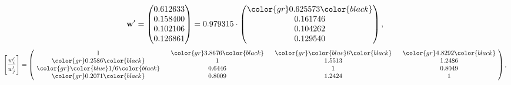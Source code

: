\begin{example}
\begin{equation*}
\mathbf{w}^{\prime} =
\begin{pmatrix}
0.612633\\
0.158400\\
0.102106\\
0.126861
\end{pmatrix} =
0.979315\cdot
\begin{pmatrix}
\color{gr} 0.625573\color{black} \\
0.161746\\
0.104262\\
0.129540
\end{pmatrix},
\end{equation*}
\begin{equation*}
\left[ \frac{{w}^{\prime}_i}{{w}^{\prime}_j} \right] =
\begin{pmatrix}
$\,\,$ 1 $\,\,$ & $\,\,$\color{gr} 3.8676\color{black} $\,\,$ & $\,\,$\color{gr} \color{blue} 6\color{black} $\,\,$ & $\,\,$\color{gr} 4.8292\color{black} $\,\,$ \\
$\,\,$\color{gr} 0.2586\color{black} $\,\,$ & $\,\,$ 1 $\,\,$ & $\,\,$1.5513$\,\,$ & $\,\,$1.2486  $\,\,$ \\
$\,\,$\color{gr} \color{blue}  1/6\color{black} $\,\,$ & $\,\,$0.6446$\,\,$ & $\,\,$ 1 $\,\,$ & $\,\,$0.8049 $\,\,$ \\
$\,\,$\color{gr} 0.2071\color{black} $\,\,$ & $\,\,$0.8009$\,\,$ & $\,\,$1.2424$\,\,$ & $\,\,$ 1  $\,\,$ \\
\end{pmatrix},
\end{equation*}
\end{example}
\newpage
